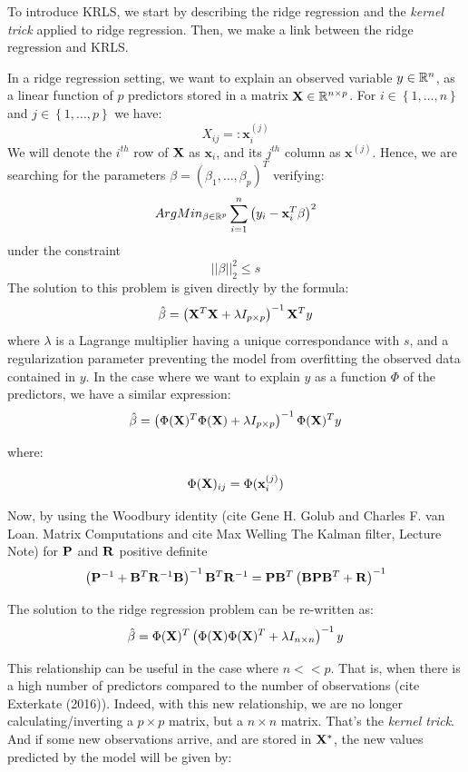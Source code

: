 To introduce KRLS, we start by describing the ridge regression \cite{hoerl1970ridge} and the {\it kernel trick} applied to ridge regression. Then, we make a link between the ridge regression and KRLS. 

In a ridge regression setting, we want to explain an observed variable $y \in \mathbb{R}^n$, as a linear function of $p$ predictors stored in a matrix ${\bf X} \in \mathbb{R}^{n \times p}$. For $i \in \left \lbrace 1, \ldots, n \right \rbrace $ and $j \in \left \lbrace1, \ldots, p \right \rbrace$ we have:
$$
X_{ij} =: \textbf{x}_i^{(j)}
$$
We will denote the $i^{th}$ row of ${\bf X}$ as $\textbf{x}_i$, and its $j^{th}$ column as $\textbf{x}^{(j)}$. Hence, we are searching for the parameters $\beta = \left(\beta_1, \ldots, \beta_p \right)^T$ verifying:
$$
ArgMin_{\beta \in \mathbb{R}^p} \sum_{i = 1}^n \left( y_i - \textbf{x}_i^T {\bf \beta} \right)^2
$$
under the constraint
$$
||\beta ||^2_2 \leq s
$$
The solution to this problem is given directly by the formula:
$$
\hat{\beta} = \left( {\bf X}^T {\bf X} + \lambda I_{p \times p} \right)^{-1}{\bf X}^T y
$$
where $\lambda$ is a Lagrange multiplier having a unique correspondance with $s$, and a regularization parameter preventing the model from overfitting the observed data contained in $y$. In the case where we want to explain $y$ as a function $\Phi$ of the predictors, we have a similar expression:
$$
\hat{\beta} = \left( \Phi({\bf X})^T \Phi({\bf X}) + \lambda I_{p \times p} \right)^{-1}\Phi({\bf X})^T y
$$

where:

$$
\Phi({\bf X})_{ij} = \Phi(\textbf{x}_i^{(j)})
$$

\medskip

Now, by using the Woodbury identity (cite Gene H. Golub and Charles F. van Loan. Matrix Computations and cite Max Welling The Kalman filter, Lecture Note) for ${\bf P}$ and ${\bf R}$ positive definite
$$
\left({\bf P}^{-1} + {\bf B}^T {\bf R}^{-1} {\bf B} \right)^{-1}{\bf B}^T {\bf R}^{-1} =
{\bf P}{\bf B}^T \left( {\bf B} {\bf P} {\bf B}^T + {\bf R}\right)^{-1}
$$

The solution to the ridge regression problem can be re-written as:
$$
\hat{\beta} = \Phi({\bf X})^T \left( \Phi({\bf X})\Phi({\bf X})^T + \lambda I_{n \times n} \right)^{-1} y
$$

This relationship can be useful in the case where $n << p$. That is, when there is a high number of predictors compared to the number of observations (cite Exterkate (2016)). Indeed, with this new relationship, we are no longer calculating/inverting a $p \times p$ matrix, but a $n \times n$ matrix. That's the {\it kernel trick}. And if some new observations arrive, and are stored in ${\bf X^*}$, the new values predicted by the model will be given by:

